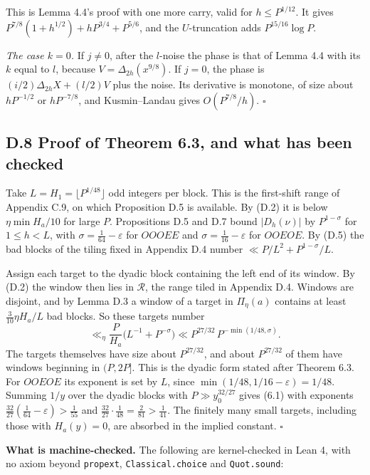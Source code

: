 \documentclass[11pt,a4paper]{article}
\begin{document}
This is Lemma 4.4's proof with one more carry, valid for
\(h\le P^{1/12}\). It gives \(P^{7/8}(1+h^{1/2})+hP^{3/4}+P^{5/6}\), and
the \(U\)-truncation adds \(P^{15/16}\log P\).

\emph{The case \(k=0\).} If \(j\ne0\), after the \(l\)-noise the phase
is that of Lemma 4.4 with its \(k\) equal to \(l\), because
\(V=\Delta_{2h}(x^{9/8})\). If \(j=0\), the phase is
\((i/2)\Delta_{2h}X+(l/2)V\) plus the noise. Its derivative is monotone,
of size about \(hP^{-1/2}\) or \(hP^{-7/8}\), and Kusmin--Landau gives
\(O(P^{7/8}/h)\). \(\square\)

\subsection{D.8 Proof of Theorem 6.3, and what has been
checked}\label{d.8-proof-of-theorem-6.3-and-what-has-been-checked}

Take \(L=H_1=\lfloor P^{1/48}\rfloor\) odd integers per block. This is
the first-shift range of Appendix C.9, on which Proposition D.5 is
available. By (D.2) it is below \(\eta\min H_a/10\) for large \(P\).
Propositions D.5 and D.7 bound \(|D_h(\nu)|\) by \(P^{1-\sigma}\) for
\(1\le h<L\), with \(\sigma=\tfrac1{64}-\varepsilon\) for \(OOOEE\) and
\(\sigma=\tfrac1{16}-\varepsilon\) for \(OOEOE\). By (D.5) the bad
blocks of the tiling fixed in Appendix D.4 number
\(\ll P/L^2+P^{1-\sigma}/L\).

Assign each target to the dyadic block containing the left end of its
window. By (D.2) the window then lies in \(\mathcal R\), the range tiled
in Appendix D.4. Windows are disjoint, and by Lemma D.3 a window of a
target in \(\Pi_\eta(a)\) contains at least \(\tfrac3{10}\eta H_a/L\)
bad blocks. So these targets number \[
\ll_\eta\frac P{H_a}\bigl(L^{-1}+P^{-\sigma}\bigr)
\ll P^{27/32}\,P^{-\min(1/48,\sigma)}.
\] The targets themselves have size about \(P^{27/32}\), and about
\(P^{27/32}\) of them have windows beginning in \((P,2P]\). This is the
dyadic form stated after Theorem 6.3. For \(OOEOE\) its exponent is set
by \(L\), since \(\min(1/48,1/16-\varepsilon)=1/48\). Summing \(1/y\)
over the dyadic blocks with \(P\gg y_0^{32/27}\) gives (6.1) with
exponents \(\tfrac{32}{27}(\tfrac1{64}-\varepsilon)>\tfrac1{55}\) and
\(\tfrac{32}{27}\cdot\tfrac1{48}=\tfrac2{81}>\tfrac1{41}\). The finitely
many small targets, including those with \(H_a(y)=0\), are absorbed in
the implied constant. \(\square\)

\textbf{What is machine-checked.} The following are kernel-checked in
Lean 4, with no axiom beyond \texttt{propext}, \texttt{Classical.choice}
and \texttt{Quot.sound}:
\end{document}
